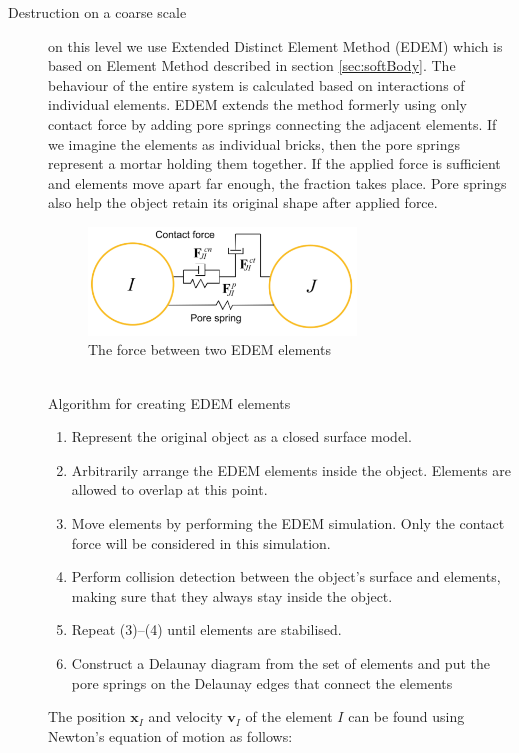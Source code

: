 \begin{description}
\item[Destruction on a coarse scale] on this level we use Extended Distinct Element Method (EDEM) which is based on Element Method described in section \ref{sec:softBody}. The behaviour of the entire system is calculated based on interactions of individual elements. EDEM extends the method formerly using only contact force by adding pore springs connecting the adjacent elements. If we imagine the elements as individual bricks, then the pore springs represent a mortar holding them together. If the applied force is sufficient and elements move apart far enough, the fraction takes place. Pore springs also help the object retain its original shape after applied force.
\begin{figure}[ht!]
        \centering
        \includegraphics[width=0.7\textwidth]{img/spring}
        \caption{The force between two EDEM elements \cite{edem}}
        \label{spring}
\end{figure}
\\Algorithm for creating EDEM elements
\begin{enumerate}
\item Represent the original object as a closed surface model.
\item Arbitrarily arrange the EDEM elements inside the object.
Elements are allowed to overlap at this point.
\item Move elements by performing the EDEM simulation. Only the contact force will be considered in this simulation.
\item Perform collision detection between the object’s surface
and elements, making sure that they always
stay inside the object.
\item Repeat (3)–(4) until elements are stabilised.
\item Construct a Delaunay diagram from the set of elements
and put the pore springs on the Delaunay edges that connect
the elements
\end{enumerate}
The position $\mathbf{x}_I$ and velocity $\mathbf{v}_I$ of the element $\mathit{I}$ can be found using Newton’s equation of motion as follows:
 

\end{description}

